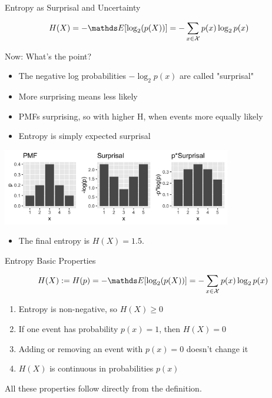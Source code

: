 \documentclass[11pt,compress,t,notes=noshow, xcolor=table]{beamer}
\begin{document}
\begin{vbframe}{Entropy as Surprisal and Uncertainty}


\begin{equation*}
\begin{aligned} 
  H(X) = - \E[\log_2(p(X))]           &= -\sum_{x \in \Xspace} p(x) \log_2 p(x) 
\end{aligned} 
\end{equation*}

Now: What's the point?
\begin{itemize}
\item The negative log probabilities $-\log_2 p(x)$ are called "surprisal"
\item More surprising means less likely
\item PMFs surprising, so with higher H, when events more equally likely
\item Entropy is simply expected surprisal
\end{itemize}


\begin{center}
\includegraphics[width = 10cm ]{figure/entropy_calc.png} 
\end{center}
\vspace{-0.5cm}
\begin{itemize}
\item The final entropy is $H(X)=1.5$.
\end{itemize}


\end{vbframe}

\begin{vbframe}{Entropy Basic Properties}

$$H(X) := H(p) = - \E[\log_2(p(X))] = -\sum_{x \in \Xspace} p(x) \log_2 p(x)$$

\vspace{0.2cm}
  \begin{enumerate}
  \setlength\itemsep{1.2em} 
    \item Entropy is non-negative, so $H(X) \geq 0$    \item If one event has probability $p(x) = 1$, then $H(X)=0$
    \item Adding or removing an event with $p(x)=0$ doesn't change it
    \item $H(X)$ is continuous in probabilities $p(x)$
  \end{enumerate}
\vspace{0.2cm}  
All these properties follow directly from the definition.


\end{vbframe}
\end{document}
